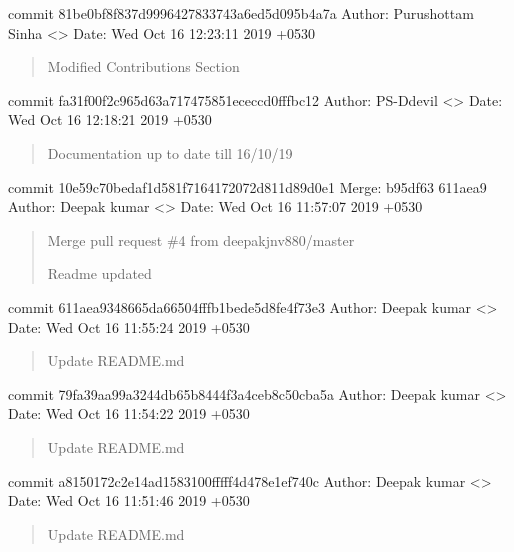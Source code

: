 \documentclass[letterpaper,10pt,english]{sphinxmanual}
\begin{document}
commit 81be0bf8f837d9996427833743a6ed5d095b4a7a
Author: Purushottam Sinha \textless{}\textgreater{}
Date:   Wed Oct 16 12:23:11 2019 +0530
\begin{quote}

Modified Contributions Section
\end{quote}

commit fa31f00f2c965d63a717475851ececcd0fffbc12
Author: PS-Ddevil \textless{}\textgreater{}
Date:   Wed Oct 16 12:18:21 2019 +0530
\begin{quote}

Documentation up to date till 16/10/19
\end{quote}

commit 10e59c70bedaf1d581f7164172072d811d89d0e1
Merge: b95df63 611aea9
Author: Deepak kumar \textless{}\textgreater{}
Date:   Wed Oct 16 11:57:07 2019 +0530
\begin{quote}

Merge pull request \#4 from deepakjnv880/master

Readme updated
\end{quote}

commit 611aea9348665da66504fffb1bede5d8fe4f73e3
Author: Deepak kumar \textless{}\textgreater{}
Date:   Wed Oct 16 11:55:24 2019 +0530
\begin{quote}

Update README.md
\end{quote}

commit 79fa39aa99a3244db65b8444f3a4ceb8c50cba5a
Author: Deepak kumar \textless{}\textgreater{}
Date:   Wed Oct 16 11:54:22 2019 +0530
\begin{quote}

Update README.md
\end{quote}

commit a8150172c2e14ad1583100fffff4d478e1ef740c
Author: Deepak kumar \textless{}\textgreater{}
Date:   Wed Oct 16 11:51:46 2019 +0530
\begin{quote}

Update README.md
\end{quote}
\end{document}
